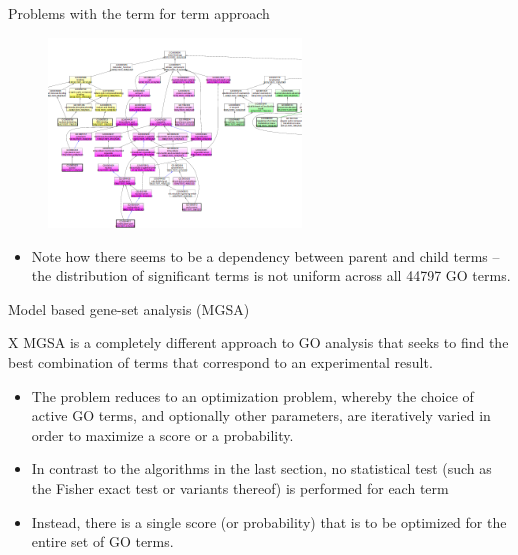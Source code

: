 \documentclass{beamer}
\begin{document}
\begin{frame}{Problems with the term for term approach}
 \begin{figure}
 \centering
 \includegraphics[width=0.6\textwidth]{./img/TfT-example.png}
\end{figure}

 \begin{itemize}
  \item Note how there seems to be a dependency between parent and child terms -- the distribution 
of significant terms is not uniform across all 44797 GO terms.
 \end{itemize}
\end{frame}

\begin{frame}{Model based gene-set analysis (MGSA)}
 \begin{mybluebox}{X}
  MGSA is a completely different approach to GO
analysis that seeks to find the best combination of terms that
correspond to an experimental result.
 \end{mybluebox}

 \begin{itemize}
  \item The
problem reduces to an optimization problem, whereby the choice of
active GO terms, and optionally other parameters, are iteratively
varied in order to maximize a score or a probability.
\item   In contrast to
the algorithms in the last section, no statistical test (such as the
Fisher exact test or variants thereof) is performed for each term
\item Instead, there is a single score (or probability) that is to be
optimized for the entire set of GO terms.
 \end{itemize}

\end{frame}
\end{document}
